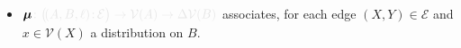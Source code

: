 \documentclass{article}
\newcommand{\notation}[2][]{#1}
\renewcommand{\notation}[2][]{{\color{notationcolor} #2}}
\newcommand{\commentout}[1]{\ignorespaces}
\newcommand{\none}{\varobslash}
\newcommand{\bmu}{\boldsymbol{\mu}}
\newcommand{\V}{\mathcal V}
\newcommand{\Ed}{\mathcal E}
\newcommand{\MN}{PDG}
\numberwithin{equation}{section}
\begin{document}
\begin{notfocus}
\begin{defn}[\MN]
\begin{itemize}[nosep]
			\item $\bmu\notation{\colon \big(\!({A,B,\ell})\colon \! \Ed \big) \to \V(A) \to \Delta\V(B)}$
			  associates, for each edge $(X,Y) \in
                          \Ed$ and $x \in \V(X)$ a distribution on $B$. 

		\end{itemize}
		
	\end{defn}

	\commentout{Here $\underline\Delta(X)$ is the collection of sub-distributions on $X$ --- i.e., distributions on $X \cup \{\none\}$, where $\none$ is a `null' element. We will call a \MN\ \emph{strict} if $\bmu$ never assigns mass to $\none$. So far only example \ref{ex:teacher} makes use of this, but we explore the implications carefully in \Cref{sec:full-model}.}
	

\end{notfocus}
\end{document}
